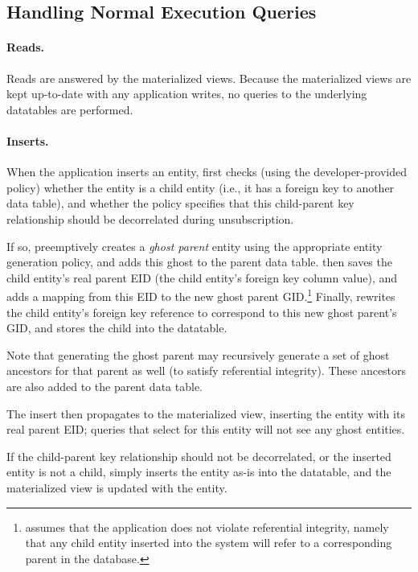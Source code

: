 \subsection{Handling Normal Execution Queries}
\paragraph{Reads.}
Reads are answered by the materialized views. Because the materialized views are kept up-to-date with any application
writes, no queries to the underlying datatables are performed.

\paragraph{Inserts.}
When the application inserts an entity, \name first checks (using the developer-provided policy)
whether the entity is a child entity (i.e., it has a foreign key to another data table), and
whether the policy specifies that this child-parent key relationship should be decorrelated during
unsubscription. 

If so, \name preemptively creates a \emph{ghost parent} entity using the appropriate entity
generation policy, and adds this ghost to the parent data table. \name then saves the child
entity's real parent EID (the child entity's foreign key column value), and adds a mapping from this
EID to the new ghost parent GID.\footnote{\name assumes that the application does not violate
referential integrity, namely that any child entity inserted into the system will refer to a
corresponding parent in the database.} Finally, \name rewrites the child entity's foreign key
reference to correspond to this new ghost parent's GID, and stores the child into the datatable.

Note that generating the ghost parent may recursively generate a set of ghost ancestors for that
parent as well (to satisfy referential integrity). These ancestors are also added to the parent data
table.

The insert then propagates to the materialized view, inserting the entity with its real parent EID; queries that
select for this entity will not see any ghost entities. 

If the child-parent key relationship should not be decorrelated, or the inserted entity is not a
child, \name simply inserts the entity as-is into the datatable, and the materialized view is
updated with the entity.


